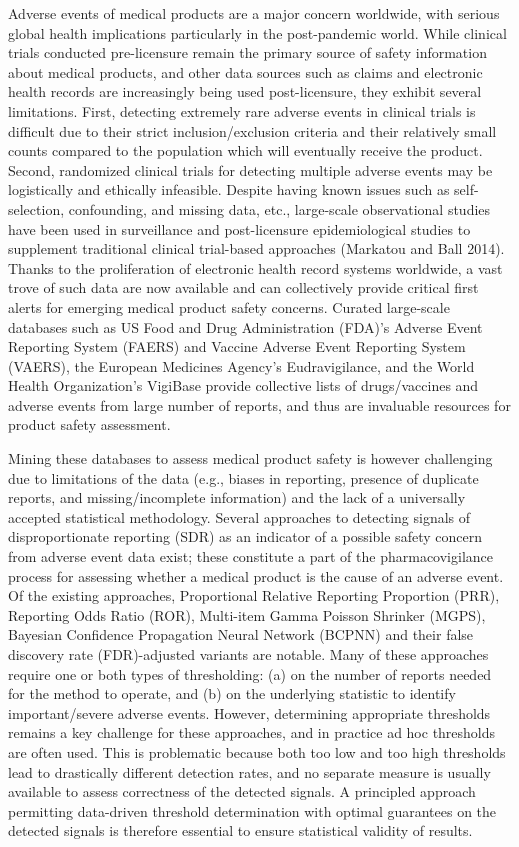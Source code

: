 Adverse events of medical products are a major concern worldwide, with serious global health implications particularly in the post-pandemic world. While clinical trials conducted pre-licensure remain the primary source of safety information about medical products, and other data sources such as claims and electronic health records are increasingly being used post-licensure, they exhibit several limitations. First, detecting extremely rare adverse events in clinical trials is difficult due to their strict inclusion/exclusion criteria and their relatively small counts compared to the population which will eventually receive the product. Second, randomized clinical trials for detecting multiple adverse events may be logistically and ethically infeasible. Despite having known issues such as self-selection, confounding, and missing data, etc., large-scale observational studies have been used in surveillance and post-licensure epidemiological studies to supplement traditional clinical trial-based approaches (Markatou and Ball 2014). Thanks to the proliferation of electronic health record systems worldwide, a vast trove of such data are now available and can collectively provide critical first alerts for emerging medical product safety concerns. Curated large-scale databases such as US Food and Drug Administration (FDA)'s Adverse Event Reporting System (FAERS) and Vaccine Adverse Event Reporting System (VAERS), the European Medicines Agency's Eudravigilance, and the World Health Organization's VigiBase provide collective lists of drugs/vaccines and adverse events from large number of reports, and thus are invaluable resources for product safety assessment.

Mining these databases to assess medical product safety is however challenging due to limitations of the data (e.g., biases in reporting, presence of duplicate reports, and missing/incomplete information) and the lack of a universally accepted statistical methodology. Several approaches to detecting signals of disproportionate reporting (SDR) as an indicator of a possible safety concern from adverse event data exist; these constitute a part of the pharmacovigilance process for assessing whether a medical product is the cause of an adverse event. Of the existing approaches, Proportional Relative Reporting Proportion (PRR), Reporting Odds Ratio (ROR), Multi-item Gamma Poisson Shrinker (MGPS), Bayesian Confidence Propagation Neural Network (BCPNN) and their false discovery rate (FDR)-adjusted variants are notable. Many of these approaches require one or both types of thresholding: (a) on the number of reports needed for the method to operate, and (b) on the underlying statistic to identify important/severe adverse events. However, determining appropriate thresholds remains a key challenge for these approaches, and in practice ad hoc thresholds are often used. This is problematic because both too low and too high thresholds lead to drastically different detection rates, and no separate measure is usually available to assess correctness of the detected signals. A principled approach permitting data-driven threshold determination with optimal guarantees on the detected signals is therefore essential to ensure statistical validity of results.

